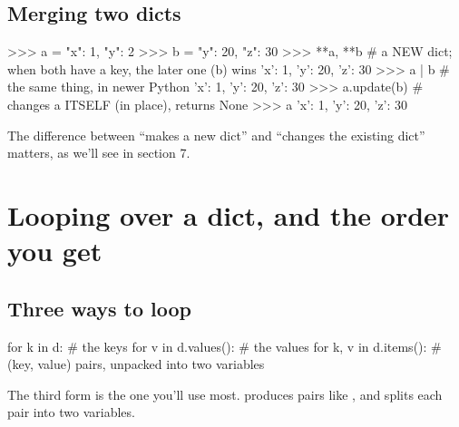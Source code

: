 \documentclass[10pt,a4paper]{article}
\begin{document}
\subsection{Merging two dicts}
\begin{txtcode}
>>> a = {"x": 1, "y": 2}
>>> b = {"y": 20, "z": 30}
>>> {**a, **b}               # a NEW dict; when both have a key, the later one (b) wins
{'x': 1, 'y': 20, 'z': 30}
>>> a | b                    # the same thing, in newer Python
{'x': 1, 'y': 20, 'z': 30}
>>> a.update(b)              # changes a ITSELF (in place), returns None
>>> a
{'x': 1, 'y': 20, 'z': 30}
\end{txtcode}
The difference between “makes a new dict” and “changes the existing dict” matters, as we’ll see in section 7.
\setcounter{section}{1}
\section{Looping over a dict, and the order you get}
\subsection{Three ways to loop}
\begin{pycode}
for k in d:              # the keys
for v in d.values():     # the values
for k, v in d.items():   # (key, value) pairs, unpacked into two variables
\end{pycode}
The third form is the one you’ll use most.  produces pairs like , and  splits each pair into two variables.
\end{document}
